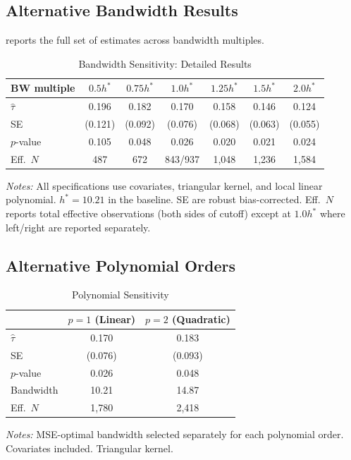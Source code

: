 \documentclass[12pt]{article}
\begin{document}
\subsection{Alternative Bandwidth Results}

 reports the full set of estimates across bandwidth multiples.

\begin{table}[H]
\centering
\caption{Bandwidth Sensitivity: Detailed Results}
\label{tab:bw_detail}
\begin{threeparttable}
\begin{tabular}{lcccccc}
\toprule
BW multiple & $0.5h^*$ & $0.75h^*$ & $1.0h^*$ & $1.25h^*$ & $1.5h^*$ & $2.0h^*$ \\
\midrule
$\hat{\tau}$ & 0.196 & 0.182 & 0.170 & 0.158 & 0.146 & 0.124 \\
SE & (0.121) & (0.092) & (0.076) & (0.068) & (0.063) & (0.055) \\
$p$-value & 0.105 & 0.048 & 0.026 & 0.020 & 0.021 & 0.024 \\
Eff.\ $N$ & 487 & 672 & 843/937 & 1,048 & 1,236 & 1,584 \\
\bottomrule
\end{tabular}
\begin{tablenotes}[flushleft]
\small
\item \textit{Notes:} All specifications use covariates, triangular kernel, and local linear polynomial. $h^* = 10.21$ in the baseline. SE are robust bias-corrected. Eff.\ $N$ reports total effective observations (both sides of cutoff) except at $1.0h^*$ where left/right are reported separately.
\end{tablenotes}
\end{threeparttable}
\end{table}

\subsection{Alternative Polynomial Orders}

\begin{table}[H]
\centering
\caption{Polynomial Sensitivity}
\label{tab:polynomial}
\begin{threeparttable}
\begin{tabular}{lcc}
\toprule
 & $p = 1$ (Linear) & $p = 2$ (Quadratic) \\
\midrule
$\hat{\tau}$ & 0.170 & 0.183 \\
SE & (0.076) & (0.093) \\
$p$-value & 0.026 & 0.048 \\
Bandwidth & 10.21 & 14.87 \\
Eff.\ $N$ & 1,780 & 2,418 \\
\bottomrule
\end{tabular}
\begin{tablenotes}[flushleft]
\small
\item \textit{Notes:} MSE-optimal bandwidth selected separately for each polynomial order. Covariates included. Triangular kernel.
\end{tablenotes}
\end{threeparttable}
\end{table}
\end{document}
